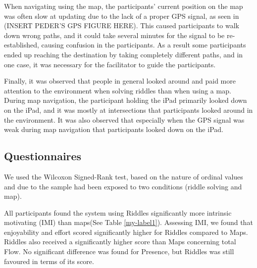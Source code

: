 When navigating using the map, the participants' current position on the map was often slow at updating due to the lack of a proper GPS signal, as seen in (INSERT PEDER'S GPS FIGURE HERE). This caused participants to walk down wrong paths, and it could take several minutes for the signal to be re-established, causing confusion in the participants. As a result some participants ended up reaching the destination by taking completely different paths, and in one case, it was necessary for the facilitator to guide the participants.

Finally, it was observed that people in general looked around and paid more attention to the environment when solving riddles than when using a map. During map navigation, the participant holding the iPad primarily looked down on the iPad, and it was mostly at intersections that participants looked around in the environment. It was also observed that especially when the GPS signal was weak during map navigation that participants looked down on the iPad. 	
	
\subsection{Questionnaires}
We used the Wilcoxon Signed-Rank test, based on the nature of ordinal values and due to the sample had been exposed to two conditions (riddle solving and map).

All participants found the system using Riddles significantly more intrinsic motivating (IMI) than maps(See Table \ref{my-label1}). Assessing IMI, we found that enjoyability and effort scored significantly higher for Riddles compared to Maps. Riddles also received a significantly higher score than Maps concerning total Flow. No significant difference was found for Presence, but Riddles was still favoured in terms of its score. 

